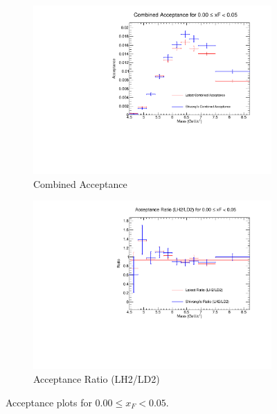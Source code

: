 \documentclass[11pt]{article}
\begin{document}
\begin{figure}[p]
\begin{subfigure}[b]{0.48\textwidth}
       \includegraphics[width=\linewidth]{./acceptancePlots/Combined_acceptance_xF_bin_0.pdf}
       \caption{Combined Acceptance}
    \end{subfigure}\hfill
    \begin{subfigure}[b]{0.48\textwidth}
       \includegraphics[width=\linewidth]{./acceptancePlots/Acceptance_ratio_xF_bin_0.pdf}
       \caption{Acceptance Ratio (LH2/LD2)}
    \end{subfigure}
    \caption{Acceptance plots for $0.00 \le x_F < 0.05$.}
\end{figure}
\end{document}
